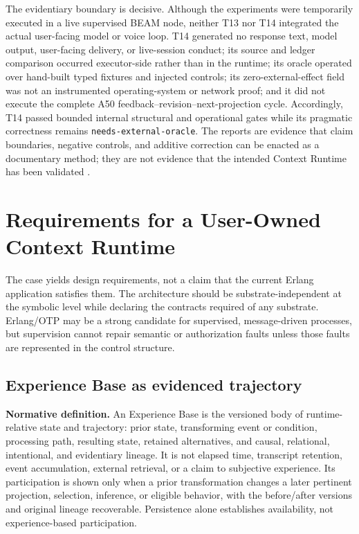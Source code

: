 \documentclass[10pt,a4paper]{article}
\begin{document}
The evidentiary boundary is decisive. Although the experiments were temporarily executed in a live supervised BEAM node, neither T13 nor T14 integrated the actual user-facing model or voice loop. T14 generated no response text, model output, user-facing delivery, or live-session conduct; its source and ledger comparison occurred executor-side rather than in the runtime; its oracle operated over hand-built typed fixtures and injected controls; its zero-external-effect field was not an instrumented operating-system or network proof; and it did not execute the complete A50 feedback--revision--next-projection cycle. Accordingly, T14 passed bounded internal structural and operational gates while its pragmatic correctness remains \texttt{needs-external-oracle}. The reports are evidence that claim boundaries, negative controls, and additive correction can be enacted as a documentary method; they are not evidence that the intended Context Runtime has been validated \cite{t13v1report,t13v2report,t14report,ctxevolution}.

\section{Requirements for a User-Owned Context Runtime}

The case yields design requirements, not a claim that the current Erlang application satisfies them. The architecture should be substrate-independent at the symbolic level while declaring the contracts required of any substrate. Erlang/OTP may be a strong candidate for supervised, message-driven processes, but supervision cannot repair semantic or authorization faults unless those faults are represented in the control structure.

\subsection{Experience Base as evidenced trajectory}

\noindent\textbf{Normative definition.} An Experience Base is the versioned body of runtime-relative state and trajectory: prior state, transforming event or condition, processing path, resulting state, retained alternatives, and causal, relational, intentional, and evidentiary lineage. It is not elapsed time, transcript retention, event accumulation, external retrieval, or a claim to subjective experience. Its participation is shown only when a prior transformation changes a later pertinent projection, selection, inference, or eligible behavior, with the before/after versions and original lineage recoverable. Persistence alone establishes availability, not experience-based participation.
\end{document}

